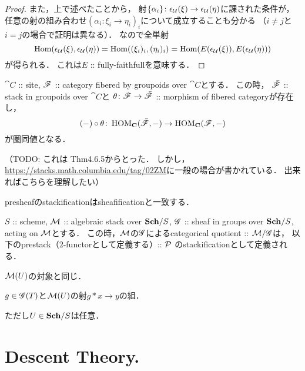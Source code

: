 \documentclass[a4paper, dvipdfmx]{jsarticle}
\newcommand{\HOM}{\operatorname{HOM}}
\begin{document}
\begin{proof}
    また，上で述べたことから，
    射$\{\alpha_i\} \colon \epsilon_{\mathcal{U}}(\xi) \to \epsilon_{\mathcal{U}}(\eta)$に課された条件が，
    任意の射の組み合わせ$(\alpha_i \colon \xi_i \to \eta_i)_i$について成立することも分かる
    （$i \neq j$と$i=j$の場合で証明は異なる）．
    なので全単射
    \[
        \operatorname{Hom}(\epsilon_{\mathcal{U}}(\xi), \epsilon_{\mathcal{U}}(\eta))
        =\operatorname{Hom}((\xi_i)_i, (\eta_i)_i)
        =\operatorname{Hom}(E(\epsilon_{\mathcal{U}}(\xi)), E(\epsilon_{\mathcal{U}}(\eta)))
    \]
    が得られる．
    これは$E$ :: fully-faithfullを意味する．
\end{proof}

\begin{Thm}
    $\cat{C}$ :: site,
    $\mathscr{F}$ :: category fibered by groupoids over $\cat{C}$とする．
    この時，
    $\bar{\mathscr{F}}$ :: stack in groupoids over $\cat{C}$と
    $\theta \colon \mathscr{F} \to \bar{\mathscr{F}}$ :: morphism of fibered categoryが存在し，
    \[ (-) \circ \theta \colon \HOM_{\cat{C}}(\bar{\fibF}, -) \to \HOM_{\cat{C}}(\fibF, -) \]
    が圏同値となる．
\end{Thm}
（TODO: これは\cite{ASS} Thm4.6.5からとった．
しかし，\url{https://stacks.math.columbia.edu/tag/02ZM}に一般の場合が書かれている．
出来ればこちらを理解したい）

\begin{Example}
    presheafのstackificationはsheafificationと一致する．
\end{Example}

\begin{Example}
    $S$ :: scheme,
    $\mathcal{M}$ :: algebraic stack over $\mathbf{Sch}/S$,
    $\mathscr{G}$ :: sheaf in groups over $\mathbf{Sch}/S$, acting on $\mathcal{M}$とする．
    この時，$\mathcal{M}$の$\mathscr{G}$によるcategorical quotient :: $\mathcal{M}/\mathscr{G}$は，
    以下のprestack（$2$-functorとして定義する）:: $\mathcal{P}$ のstackificationとして定義される．
    \begin{description}[labelindent=1cm]
        \item[Objects of $\shP(U)$.] $\mathcal{M}(U)$の対象と同じ．
        \item[Arrows of $\shP(U)$.]  $g \in \mathscr{G}(T)$と$\mathcal{M}(U)$の射$g \ast x \to y$の組．
    \end{description}
    ただし$U \in \mathbf{Sch}/S$は任意．
\end{Example}

\section{Descent Theory.}
\end{document}
